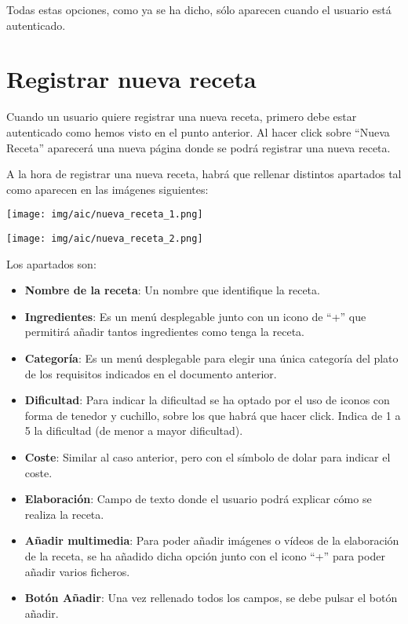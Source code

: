 \documentclass{\ClassPath/viu-tfm-template}
\begin{document}
Todas estas opciones, como ya se ha dicho, sólo aparecen cuando el usuario está autenticado.


\section{Registrar nueva receta}

Cuando un usuario quiere registrar una nueva receta, primero debe estar autenticado como hemos visto en el punto anterior. Al hacer click sobre “{\color{maincolor}Nueva Receta}” aparecerá una nueva página donde se podrá registrar una nueva receta.

A la hora de registrar una nueva receta, habrá que rellenar distintos apartados tal como aparecen en las imágenes siguientes:


    \begin{center}
        \vspace{-10pt}
        \texttt{[image: img/aic/nueva\_receta\_1.png]}
        \vspace{-20pt}
    \end{center}

    \begin{center}
        \vspace{-10pt}
        \texttt{[image: img/aic/nueva\_receta\_2.png]}
        \vspace{-20pt}
    \end{center}

Los apartados son:

\vspace{-1em}
\begin{itemize}
    \item \textbf{Nombre de la receta}: Un nombre que identifique la receta.
    \item \textbf{Ingredientes}: Es un menú desplegable junto con un icono de “+” que permitirá añadir tantos ingredientes como tenga la receta.
    \item \textbf{Categoría}: Es un menú desplegable para elegir una única categoría del plato de los requisitos indicados en el documento anterior.
    \item \textbf{Dificultad}: Para indicar la dificultad se ha optado por el uso de iconos con forma de tenedor y cuchillo, sobre los que habrá que hacer click. Indica de 1 a 5 la dificultad (de menor a mayor dificultad).
    \item \textbf{Coste}: Similar al caso anterior, pero con el símbolo de dolar para indicar el coste.
    \item \textbf{Elaboración}: Campo de texto donde el usuario podrá explicar cómo se realiza la receta.
    \item \textbf{Añadir multimedia}: Para poder añadir imágenes o vídeos de  la elaboración de la receta, se ha añadido dicha opción junto con el icono “+” para poder añadir varios ficheros.
    \item \textbf{Botón Añadir}: Una vez rellenado todos los campos, se debe pulsar el botón añadir.
\end{itemize}
\end{document}

